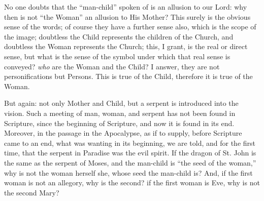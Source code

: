 No one doubts that the ``man-child'' spoken of is an allusion
to our Lord: why then is not ``the Woman'' an allusion to His
Mother? This surely is the obvious sense of the words; of course they
have a further sense also, which is the scope of the image; doubtless
the Child represents the children of the Church, and doubtless the Woman
represents the Church; this, I grant, is the real or direct sense, but
what is the sense of the symbol under which that real sense is conveyed?
\emph{who} are the Woman and the Child? I answer, they are not
personifications but Persons. This is true of the Child, therefore it is
true of the Woman.

But again: not only Mother and Child, but a serpent is introduced
into the vision. Such a meeting of man, woman, and serpent has not been
found in Scripture, since the beginning of Scripture, and now it is
found in its end. Moreover, in the passage in the Apocalypse, as if
to supply, before Scripture came to an end, what was wanting in its
beginning, we are told, and for the first time, that the serpent in
Paradise was the evil spirit. If the dragon of St. John is the same as
the serpent of Moses, and the man-child is ``the seed of the
woman,'' why is not the woman herself she, whose seed the man-child
is? And, if the first woman is not an allegory, why is the second? if
the first woman is Eve, why is not the second Mary?

